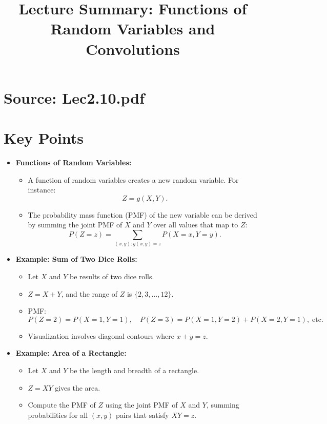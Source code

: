 \documentclass{article}
\title{Lecture Summary: Functions of Random Variables and Convolutions}
\author{}
\date{}
\begin{document}
\maketitle

\section*{Source: Lec2.10.pdf}

\section*{Key Points}

\begin{itemize}
  \item \textbf{Functions of Random Variables:}
    \begin{itemize}
      \item A function of random variables creates a new random variable. For instance:
        \[
          Z = g(X, Y).
        \]
      \item The probability mass function (PMF) of the new variable can be derived by summing the joint PMF of $X$ and $Y$ over all values that map to $Z$:
        \[
          P(Z = z) = \sum_{(x, y): g(x, y) = z} P(X = x, Y = y).
        \]
    \end{itemize}

  \item \textbf{Example: Sum of Two Dice Rolls:}
    \begin{itemize}
      \item Let $X$ and $Y$ be results of two dice rolls.
      \item $Z = X + Y$, and the range of $Z$ is $\{2, 3, \dots, 12\}$.
      \item PMF:
        \[
          P(Z = 2) = P(X = 1, Y = 1), \quad P(Z = 3) = P(X = 1, Y = 2) + P(X = 2, Y = 1), \; \text{etc.}
        \]
      \item Visualization involves diagonal contours where $x + y = z$.
    \end{itemize}

  \item \textbf{Example: Area of a Rectangle:}
    \begin{itemize}
      \item Let $X$ and $Y$ be the length and breadth of a rectangle.
      \item $Z = XY$ gives the area.
      \item Compute the PMF of $Z$ using the joint PMF of $X$ and $Y$, summing probabilities for all $(x, y)$ pairs that satisfy $XY = z$.
    \end{itemize}


\end{itemize}
\end{document}
